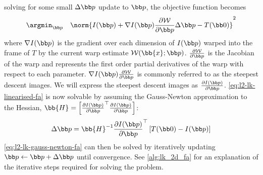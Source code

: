solving for some small $\Delta \p$ update to $\p$, the objective function
becomes
\begin{equation}\label{eq:l2-lk-linearised-fa}
    \argmin_{\p} \quad \norm{I(\p) + \nabla I(\p) \frac{\partial \mathcal{W}}{\partial \p} \Delta \p - T(\zero)}^2
\end{equation}
where $\nabla I(\p)$ is the gradient over each dimension of $I(\p)$ warped into the
frame of $T$ by the current warp estimate $\mathcal{W}(\bb{x};\p)$.
$\frac{\partial \mathcal{W}}{\partial \p}$ is the Jacobian of the warp and
represents the first order partial derivatives of the warp with respect to each
parameter. $\nabla I(\p) \frac{\partial \mathcal{W}}{\partial \p}$ is commonly
referred to as the steepest descent images. We will express the steepest descent
images as $\frac{\partial I(\p)}{\partial \p}$.
\cref{eq:l2-lk-linearised-fa} is now solvable by assuming the
Gauss-Newton approximation to the Hessian,
$\bb{H} = \left[ {\frac{\partial I(\p)}{\partial \p}}^{\top} \frac{\partial I(\p)}{\partial \p} \right]$:
\begin{equation}\label{eq:l2-lk-gauss-newton-fa}
    \Delta \p = \bb{H}^{-1} \frac{\partial I(\p)}{\partial \p}^{\top} \left[ T(\zero) - I(\p) \right]
\end{equation}
\cref{eq:l2-lk-gauss-newton-fa} can then be solved by iteratively
updating $\p \leftarrow \p + \Delta \p$ until convergence.
See \cref{alg:lk_2d_fa} for an explanation of the iterative steps required
for solving the problem.

